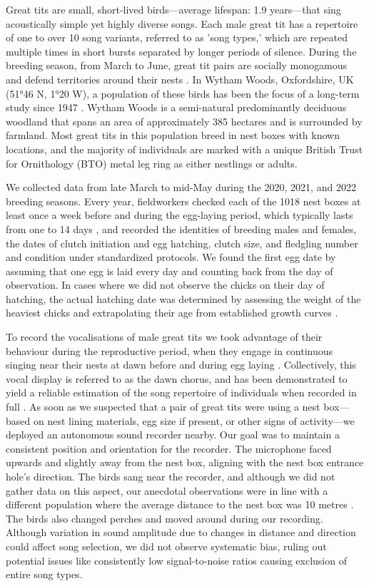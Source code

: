 Great tits are small, short-lived birds---average lifespan: 1.9 years---that sing acoustically simple yet highly diverse songs. Each male great tit has a repertoire of one to over 10 song variants, referred to as 'song types,' which are repeated multiple times in short bursts separated by longer periods of silence. During the breeding season, from March to June, great tit pairs are socially monogamous and defend territories around their nests \parencite{hinde1952}. In Wytham Woods, Oxfordshire, UK (51°46 N, 1°20 W), a population of these birds has been the focus of a long-term study since 1947 \parencite{lack1964}. Wytham Woods is a semi-natural predominantly deciduous woodland that spans an area of approximately 385 hectares and is surrounded by farmland. Most great tits in this population breed in nest boxes with known locations, and the majority of individuals are marked with a unique British Trust for Ornithology (BTO) metal leg ring as either nestlings or adults.

We collected data from late March to mid-May during the 2020, 2021, and 2022 breeding seasons. Every year, fieldworkers checked each of the 1018 nest boxes at least once a week before and during the egg-laying period, which typically lasts from one to 14 days \parencite{Perrins1965}, and recorded the identities of breeding males and females, the dates of clutch initiation and egg hatching, clutch size, and fledgling number and condition under standardized protocols. We found the first egg date by assuming that one egg is laid every day and counting back from the day of observation. In cases where we did not observe the chicks on their day of hatching, the actual hatching date was determined by assessing the weight of the heaviest chicks and extrapolating their age from established growth curves \parencite{cresswell2003, gibb1950}.

To record the vocalisations of male great tits we took advantage of their behaviour during the reproductive period, when they engage in continuous singing near their nests at dawn before and during egg laying \parencite{mace1987}. Collectively, this vocal display is referred to as the dawn chorus, and has been demonstrated to yield a reliable estimation of the song repertoire of individuals when recorded in full \parencite{rivera-gutierrez2012, vanduyse2005}. As soon as we suspected that a pair of great tits were using a nest box---based on nest lining materials, egg size if present, or other signs of activity---we deployed an autonomous sound recorder nearby. Our goal was to maintain a consistent position and orientation for the recorder. The microphone faced upwards and slightly away from the nest box, aligning with the nest box entrance hole's direction. The birds sang near the recorder, and although we did not gather data on this aspect, our anecdotal observations were in line with a different population where the average distance to the nest box was 10 metres \parencite{halfwerk2012}. The birds also changed perches and moved around during our recording. Although variation in sound amplitude due to changes in distance and direction could affect song selection, we did not observe systematic bias, ruling out potential issues like consistently low signal-to-noise ratios causing exclusion of entire song types.


